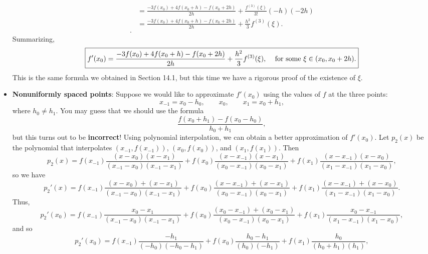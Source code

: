 \documentclass{report}
\begin{document}
\begin{itemize}
\begin{align*}
&= \frac{- 3f(x_0) + 4f(x_0 + h) - f(x_0 + 2h)}{2h} + \frac{f^{(3)}(\xi)}{3!}(-h)(-2h) \\
&= \frac{- 3f(x_0) + 4f(x_0 + h) - f(x_0 + 2h)}{2h} + \frac{h^2}{3} f^{(3)}(\xi). \\
            .\end{align*}
            \bigbreak \noindent 
            Summarizing,
            \bigbreak \noindent 
            $$
            \fbox{$
                {\displaystyle
            f'(x_0) = \frac{- 3f(x_0) + 4f(x_0 + h) - f(x_0 + 2h)}{2h} + \frac{h^2}{3} f^{(3)}(\xi)}, \quad$ for some $\xi \in (x_0, x_0 + 2h).$}
            $$
            This is the same formula we obtained in Section 14.1, but this time we have a rigorous proof of the existence of $\xi$.
        \item \textbf{Nonuniformly spaced points}:
            Suppose we would like to approximate $f'(x_0)$ using the values of $f$ at the three points:
            $$x_{-1} = x_0 - h_0, \qquad x_0, \qquad x_1 = x_0 + h_1,$$
            where $h_0 \neq h_1$.
            You may guess that we should use the formula
            $$\frac{f(x_0 + h_1) - f(x_0 - h_0)}{h_0 + h_1},$$
            but this turns out to be \textbf{incorrect}!
            \bigbreak \noindent 
            Using polynomial interpolation, we can obtain a better approximation of $f'(x_0)$.
            \bigbreak \noindent 
            Let $p_2(x)$ be the polynomial that interpolates $(x_{-1},f(x_{-1}))$, $(x_0, f(x_0))$, and $(x_1, f(x_1))$.
            Then
            $$p_2(x) = 
            f(x_{-1}) \frac{(x - x_0)(x - x_1)}{(x_{-1} - x_0)(x_{-1} - x_1)} + 
            f(x_0) \frac{(x - x_{-1})(x - x_1)}{(x_0 - x_{-1})(x_0 - x_1)} + 
            f(x_1) \frac{(x - x_{-1})(x - x_0)}{(x_1 - x_{-1})(x_1 - x_0)},$$
            so we have
            $$p_2'(x) = 
            f(x_{-1}) \frac{(x - x_0) + (x - x_1)}{(x_{-1} - x_0)(x_{-1} - x_1)} + 
            f(x_0) \frac{(x - x_{-1})+(x - x_1)}{(x_0 - x_{-1})(x_0 - x_1)} + 
            f(x_1) \frac{(x - x_{-1})+(x - x_0)}{(x_1 - x_{-1})(x_1 - x_0)}.$$
            \bigbreak \noindent 
            Thus,
            $$p_2'(x_0) = 
            f(x_{-1}) \frac{x_0 - x_1}{(x_{-1} - x_0)(x_{-1} - x_1)} + 
            f(x_0) \frac{(x_0 - x_{-1})+(x_0 - x_1)}{(x_0 - x_{-1})(x_0 - x_1)} + 
            f(x_1) \frac{x_0 - x_{-1}}{(x_1 - x_{-1})(x_1 - x_0)},$$
            and so
            $$p_2'(x_0) = 
            f(x_{-1}) \frac{-h_1}{(-h_0)(-h_0-h_1)} + 
            f(x_0) \frac{h_0-h_1}{(h_0)(-h_1)} + 
            f(x_1) \frac{h_0}{(h_0+h_1)(h_1)},$$

\end{itemize}
\end{document}
